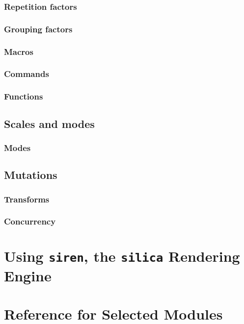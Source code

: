\documentclass{book}
\begin{document}
\section{Repetition factors}

\section{Grouping factors}

\section{Macros}

\section{Commands}

\section{Functions}

\chapter{Scales and modes}
\section{Modes}

\chapter{Mutations}
\section{Transforms}

\section{Concurrency}

\part{Using \texttt{siren}, the \texttt{silica} Rendering Engine}

\part{Reference for Selected Modules}
\end{document}
